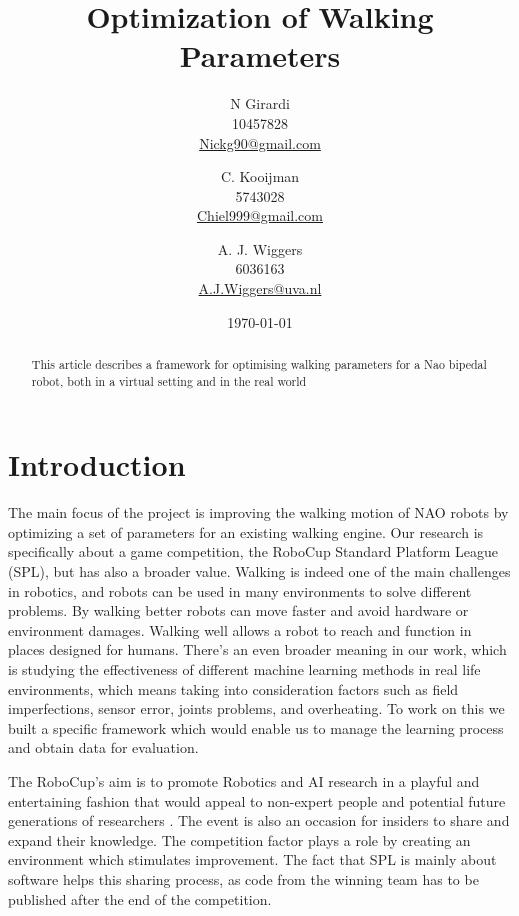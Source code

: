 \documentclass[a4paper, twocolumn]{article}
\title{Optimization of Walking Parameters}
\author{
N Girardi\\10457828\\\url{Nickg90@gmail.com} \and
C. Kooijman\\5743028\\\url{Chiel999@gmail.com} \and
A. J. Wiggers\\6036163\\\url{A.J.Wiggers@uva.nl}
}
\date{\today}
\begin{document}
\maketitle


\begin{abstract}
	This article describes a framework for optimising walking parameters for a
	Nao bipedal robot, both in a virtual setting and in the real world
\end{abstract}

\section{Introduction}
The main focus of the project is improving the walking motion of NAO robots by
optimizing a set of parameters for an existing walking engine. Our research is
specifically about a game competition, the RoboCup Standard Platform League
(SPL), but has also a broader value. Walking is indeed one of the main
challenges in robotics, and robots can be used in many environments to solve
different problems. By walking better robots can move faster and avoid hardware
or environment damages. Walking well allows a robot to reach and function in
places designed for humans. There's an even broader meaning in our work, which
is studying the effectiveness of different machine learning methods in real
life environments, which means taking into consideration factors such as field
imperfections, sensor error, joints problems, and overheating. To work on this
we built a specific framework which would enable us to manage the learning
process and obtain data for evaluation. 

The RoboCup's aim is to promote Robotics and AI research in a playful and
entertaining fashion that would appeal to non-expert people and potential
future generations of researchers \citep{kitano1997robocup}. The event is also
an occasion for insiders to share and expand their knowledge. The competition
factor plays a role by creating an environment which stimulates improvement.
The fact that SPL is mainly about software helps this sharing process, as code
from the winning team has to be published after the end of the competition. 
\end{document}
